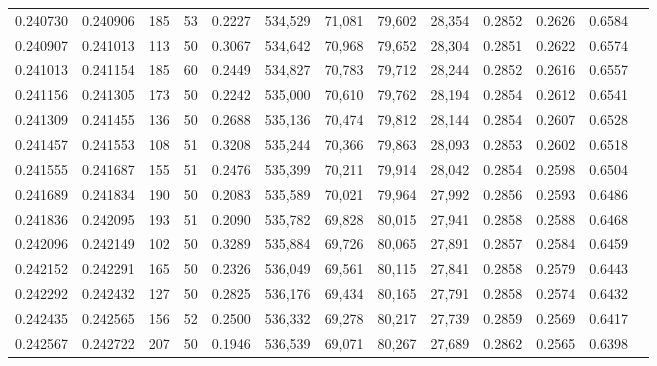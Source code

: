 \begin{tabular}{rrrrrrrrrrrrr}
0.240730 & 0.240906 &   185 &  53 &                                     0.2227 & 534,529 &  71,081 &  79,602 &  28,354 & 0.2852 & 0.2626 & 0.6584 \\
0.240907 & 0.241013 &   113 &  50 &                                     0.3067 & 534,642 &  70,968 &  79,652 &  28,304 & 0.2851 & 0.2622 & 0.6574 \\
0.241013 & 0.241154 &   185 &  60 &                                     0.2449 & 534,827 &  70,783 &  79,712 &  28,244 & 0.2852 & 0.2616 & 0.6557 \\
0.241156 & 0.241305 &   173 &  50 &                                     0.2242 & 535,000 &  70,610 &  79,762 &  28,194 & 0.2854 & 0.2612 & 0.6541 \\
0.241309 & 0.241455 &   136 &  50 &                                     0.2688 & 535,136 &  70,474 &  79,812 &  28,144 & 0.2854 & 0.2607 & 0.6528 \\
0.241457 & 0.241553 &   108 &  51 &                                     0.3208 & 535,244 &  70,366 &  79,863 &  28,093 & 0.2853 & 0.2602 & 0.6518 \\
0.241555 & 0.241687 &   155 &  51 &                                     0.2476 & 535,399 &  70,211 &  79,914 &  28,042 & 0.2854 & 0.2598 & 0.6504 \\
0.241689 & 0.241834 &   190 &  50 &                                     0.2083 & 535,589 &  70,021 &  79,964 &  27,992 & 0.2856 & 0.2593 & 0.6486 \\
0.241836 & 0.242095 &   193 &  51 &                                     0.2090 & 535,782 &  69,828 &  80,015 &  27,941 & 0.2858 & 0.2588 & 0.6468 \\
0.242096 & 0.242149 &   102 &  50 &                                     0.3289 & 535,884 &  69,726 &  80,065 &  27,891 & 0.2857 & 0.2584 & 0.6459 \\
0.242152 & 0.242291 &   165 &  50 &                                     0.2326 & 536,049 &  69,561 &  80,115 &  27,841 & 0.2858 & 0.2579 & 0.6443 \\
0.242292 & 0.242432 &   127 &  50 &                                     0.2825 & 536,176 &  69,434 &  80,165 &  27,791 & 0.2858 & 0.2574 & 0.6432 \\
0.242435 & 0.242565 &   156 &  52 &                                     0.2500 & 536,332 &  69,278 &  80,217 &  27,739 & 0.2859 & 0.2569 & 0.6417 \\
0.242567 & 0.242722 &   207 &  50 &                                     0.1946 & 536,539 &  69,071 &  80,267 &  27,689 & 0.2862 & 0.2565 & 0.6398 \\

\end{tabular}
